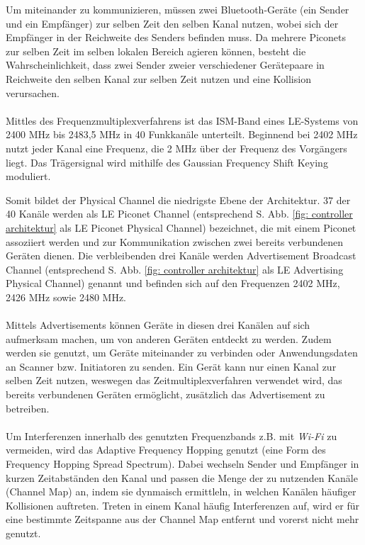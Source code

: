 Um miteinander zu kommunizieren, müssen zwei Bluetooth-Geräte (ein Sender und ein Empfänger) zur selben Zeit den selben Kanal nutzen, wobei sich der Empfänger in der Reichweite des Senders befinden muss. Da mehrere Piconets zur selben Zeit im selben lokalen Bereich agieren können, besteht die Wahrscheinlichkeit, dass zwei Sender zweier verschiedener Gerätepaare in Reichweite den selben Kanal zur selben Zeit nutzen und eine Kollision verursachen.
\\\\
Mittles des Frequenzmultiplexverfahrens ist das ISM-Band eines LE-Systems von 2400 MHz bis 2483,5 MHz in 40 Funkkanäle unterteilt. Beginnend bei 2402 MHz nutzt jeder Kanal eine Frequenz, die 2 MHz über der Frequenz des Vorgängers liegt. Das Trägersignal wird mithilfe des Gaussian Frequency Shift Keying moduliert. \cite{BtSpec4.0_2180-2181}

Somit bildet der Physical Channel die niedrigste Ebene der Architektur. 37 der 40 Kanäle werden als LE Piconet Channel (entsprechend S. \pageref{fig: controller architektur} Abb. \ref{fig: controller architektur} als LE Piconet Physical Channel) bezeichnet, die mit einem Piconet assoziiert werden und zur Kommunikation zwischen zwei bereits verbundenen Geräten dienen. Die verbleibenden drei Kanäle werden Advertisement Broadcast Channel (entsprechend S. \pageref{fig: controller architektur} Abb. \ref{fig: controller architektur} als LE Advertising Physical Channel) genannt und befinden sich auf den Frequenzen 2402 MHz, 2426 MHz sowie 2480 MHz. \cite{BtSpec4.0_2199}
\\\\
Mittels Advertisements können Geräte in diesen drei Kanälen auf sich aufmerksam machen, um von anderen Geräten entdeckt zu werden. Zudem werden sie genutzt, um Geräte miteinander zu verbinden oder Anwendungsdaten an Scanner bzw. Initiatoren zu senden. Ein Gerät kann nur einen Kanal zur selben Zeit nutzen, weswegen das Zeitmultiplexverfahren verwendet wird, das bereits verbundenen Geräten ermöglicht, zusätzlich das Advertisement zu betreiben.
\\\\
Um Interferenzen innerhalb des genutzten Frequenzbands z.B. mit \textit{Wi-Fi} zu vermeiden, wird das Adaptive Frequency Hopping \cite{BtAfh} genutzt (eine Form des Frequency Hopping Spread Spectrum). Dabei wechseln Sender und Empfänger in kurzen Zeitabständen den Kanal und passen die Menge der zu nutzenden Kanäle (Channel Map) an, indem sie dynmaisch ermittleln, in welchen Kanälen häufiger Kollisionen auftreten. Treten in einem Kanal häufig Interferenzen auf, wird er für eine bestimmte Zeitspanne aus der Channel Map entfernt und vorerst nicht mehr genutzt.
